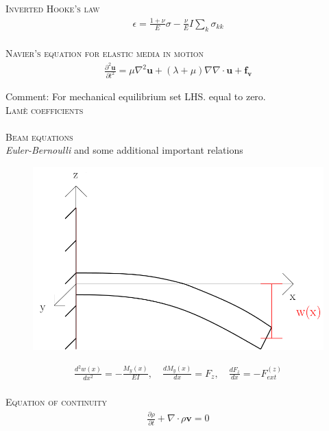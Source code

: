 \documentclass[11pt,a4paper,english]{article}
\begin{document}
{\scshape Inverted Hooke's law} \\
\begin{align*}
\epsilon = \frac{1+\nu}{E}\sigma - \frac{\nu}{E}I \sum_k \sigma_{kk}
\end{align*}
\\[2ex]

{\scshape Navier's equation for elastic media in motion} \\
\begin{align*}
\frac{\partial^2 \mathbf{u}}{\partial t^2} = \mu \nabla^2 \mathbf{u} + (\lambda + \mu) \nabla \nabla \cdot \mathbf{u} + \mathbf{f_v}
\end{align*}

Comment: For mechanical equilibrium set LHS. equal to zero. 
\\[2ex]

{\scshape Lamè coefficients} \\
\\[2ex]

{\scshape Beam equations} \\

\emph{Euler-Bernoulli} and some additional important relations

\begin{figure}[h!]
\centering
\includegraphics[scale=0.15]{figures/beam.png}
\end{figure}


\begin{align*}
\frac{d^2 w(x)}{dx^2} = - \frac{M_y (x)}{EI}, \quad \frac{dM_y(x)}{dx} = F_z, \quad \frac{dF_z}{dx} = - F_{ext}^{(z)} 
\end{align*}
\\[2ex]

{\scshape Equation of continuity} \\
\begin{align*}
\frac{\partial \rho}{\partial t} + \nabla \cdot  \rho \mathbf{v} = 0
\end{align*}
\\[2ex]
\end{document}
